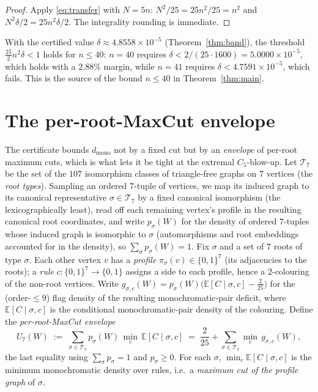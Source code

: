 \documentclass[11pt]{article}
\theoremstyle{remark}
\newcommand{\dmono}{d_{\mathrm{mono}}}
\begin{document}
\begin{proof}
Apply \eqref{eq:transfer} with $N=5n$: $N^2/25=25n^2/25=n^2$ and
$N^2\delta/2=25n^2\delta/2$. The integrality rounding is immediate.
\end{proof}

With the certified value $\delta\approx 4.8558\times10^{-5}$
(Theorem~\ref{thm:band}), the threshold $\tfrac{25}{2}n^2\delta<1$ holds for
$n\le 40$: $n=40$ requires $\delta<2/(25\cdot 1600)=5.0000\times10^{-5}$, which holds
with a $2.88\%$ margin, while $n=41$ requires $\delta<4.7591\times10^{-5}$, which
fails. This is the source of the bound $n\le 40$ in Theorem~\ref{thm:main}.

\section{The per-root-MaxCut envelope}\label{sec:env}

The certificate bounds $\dmono$ not by a fixed cut but by an \emph{envelope} of
per-root maximum cuts, which is what lets it be tight at the extremal
$C_5$-blow-up. Let $\mathcal{T}_7$ be the set of the $107$ isomorphism classes of triangle-free
graphs on $7$ vertices (the \emph{root types}). Sampling an ordered $7$-tuple of
vertices, we map its induced graph to its canonical representative
$\sigma\in\mathcal{T}_7$ by a fixed canonical isomorphism (the lexicographically
least), read off each remaining vertex's profile in the resulting canonical root
coordinates, and write $p_\sigma(W)$ for the density of ordered $7$-tuples whose
induced graph is isomorphic to $\sigma$ (automorphisms and root embeddings
accounted for in the density), so $\sum_\sigma p_\sigma(W)=1$. Fix $\sigma$ and a set of $7$ roots of type $\sigma$. Each other
vertex $v$ has a \emph{profile} $\pi_\sigma(v)\in\{0,1\}^7$ (its adjacencies to the
roots); a \emph{rule} $c\colon\{0,1\}^7\to\{0,1\}$ assigns a side to each profile,
hence a $2$-colouring of the non-root vertices. Write
$g_{\sigma,c}(W)=p_\sigma(W)\bigl(\mathbb{E}[C\mid\sigma,c]-\tfrac{2}{25}\bigr)$ for
the (order-$\le 9$) flag density of the resulting monochromatic-pair deficit, where
$\mathbb{E}[C\mid\sigma,c]$ is the conditional monochromatic-pair density of the
colouring. Define the \emph{per-root-MaxCut envelope}
\[
  U_7(W)\;:=\;\sum_{\sigma\in\mathcal{T}_7}p_\sigma(W)\,\min_c\,\mathbb{E}[C\mid\sigma,c]
        \;=\;\frac{2}{25}+\sum_{\sigma\in\mathcal{T}_7}\min_c\,g_{\sigma,c}(W),
\]
the last equality using $\sum_\sigma p_\sigma=1$ and $p_\sigma\ge 0$. For each
$\sigma$, $\min_c\mathbb{E}[C\mid\sigma,c]$ is the minimum monochromatic density
over rules, i.e.\ a \emph{maximum cut of the profile graph} of $\sigma$.
\end{document}
